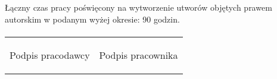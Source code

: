 \documentclass[10pt,a4paper,oneside]{report}
\begin{document}
\begin{flushleft}
    Łączny czas pracy poświęcony na wytworzenie utworów objętych prawem autorskim w podanym wyżej okresie: 90 godzin.
\end{flushleft}

\paragraph{}

\begin{center}
\begin{tabular}{p{55mm} p{55mm}}

\begin{flushleft}Podpis pracodawcy\end{flushleft} & \begin{flushright}Podpis pracownika\end{flushright}

\end{tabular}
\end{center}
    
\end{document}
